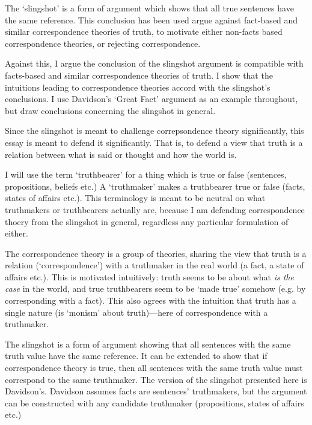 The `slingshot' is a form of argument which shows that all true sentences have the same reference.
This conclusion has been used argue against fact-based and similar correspondence theories of truth, to motivate either non-facts based correspondence theories, or rejecting correspondence.

Against this, I argue the conclusion of the slingshot argument is compatible with facts-based and similar correspondence theories of truth.
I show that the intuitions leading to correspondence theories accord with the slingshot's conclusions.
I use Davidson's `Great Fact' argument as an example throughout, but draw conclusions concerning the slingshot in general.

Since the slingshot is meant to challenge correpsondence theory significantly, this essay is meant to defend it significantly.
That is, to defend a view that truth is a relation between what is said or thought and how the world is.

I will use the term `truthbearer' for a thing which is true or false (sentences, propositions, beliefs etc.)
A `truthmaker' makes a truthbearer true or false (facts, states of affairs etc.).
This terminology is meant to be neutral on what truthmakers or truthbearers actually are, because I am defending correspondence thoery from the slingshot in general, regardless any particular formulation of either.

The correspondence theory is a group of theories, sharing the view that truth is a relation (`correspondence') with a truthmaker in the real world (a fact, a state of affairs etc.).
This is motivated intuitively: truth seems to be about what \emph{is the case} in the world, and true truthbearers seem to be `made true' somehow (e.g. by corresponding with a fact).
This also agrees with the intuition that truth has a single nature (is `monism' about truth)---here of correspondence with a truthmaker.

The slingshot is a form of argument showing that all sentences with the same truth value have the same reference.
It can be extended to show that if correspondence theory is true, then all sentences with the same truth value must correspond to the same truthmaker.
The version of the slingshot presented here is Davidson's.
\parencite[753]{Davidson_1969}
Davidson assumes facts are sentences' truthmakers, but the argument can be constructed with any candidate truthmaker (propositions, states of affairs etc.) %
\parencite[752]{Davidson_1969}

